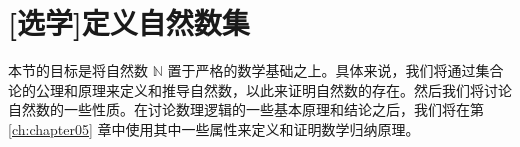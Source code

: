 \section[定义自然数集]{[选学]定义自然数集}\label{sec:section3.8}

本节的目标是将自然数 $\mathbb{N}$ 置于严格的数学基础之上。具体来说，我们将通过集合论的公理和原理来定义和推导自然数，以此来证明自然数的存在。然后我们将讨论自然数的一些性质。在讨论数理逻辑的一些基本原理和结论之后，我们将在第 \ref{ch:chapter05} 章中使用其中一些属性来定义和证明数学归纳原理。





